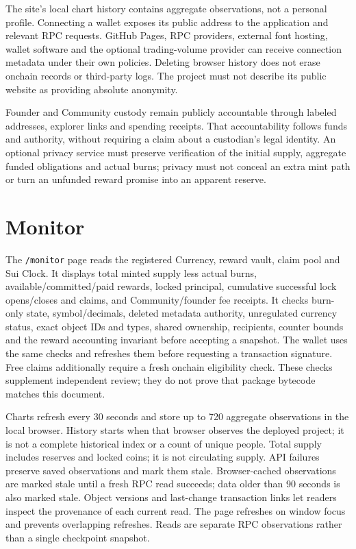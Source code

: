 \documentclass[11pt]{article}
\begin{document}
The site's local chart history contains aggregate observations, not a personal profile. Connecting a wallet exposes its public address to the application and relevant RPC requests. GitHub Pages, RPC providers, external font hosting, wallet software and the optional trading-volume provider can receive connection metadata under their own policies. Deleting browser history does not erase onchain records or third-party logs. The project must not describe its public website as providing absolute anonymity.

Founder and Community custody remain publicly accountable through labeled addresses, explorer links and spending receipts. That accountability follows funds and authority, without requiring a claim about a custodian's legal identity. An optional privacy service must preserve verification of the initial supply, aggregate funded obligations and actual burns; privacy must not conceal an extra mint path or turn an unfunded reward promise into an apparent reserve.

\section{Monitor}

The \texttt{/monitor} page reads the registered Currency, reward vault, claim pool and Sui Clock. It displays total minted supply less actual burns, available/committed/paid rewards, locked principal, cumulative successful lock opens/closes and claims, and Community/founder fee receipts. It checks burn-only state, symbol/decimals, deleted metadata authority, unregulated currency status, exact object IDs and types, shared ownership, recipients, counter bounds and the reward accounting invariant before accepting a snapshot. The wallet uses the same checks and refreshes them before requesting a transaction signature. Free claims additionally require a fresh onchain eligibility check. These checks supplement independent review; they do not prove that package bytecode matches this document.

Charts refresh every 30 seconds and store up to 720 aggregate observations in the local browser. History starts when that browser observes the deployed project; it is not a complete historical index or a count of unique people. Total supply includes reserves and locked coins; it is not circulating supply. API failures preserve saved observations and mark them stale. Browser-cached observations are marked stale until a fresh RPC read succeeds; data older than 90 seconds is also marked stale. Object versions and last-change transaction links let readers inspect the provenance of each current read. The page refreshes on window focus and prevents overlapping refreshes. Reads are separate RPC observations rather than a single checkpoint snapshot.
\end{document}

